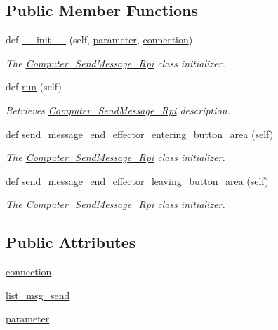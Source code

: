 \subsection*{Public Member Functions}
\begin{DoxyCompactItemize}
\item 
def \hyperlink{classRET__socket_1_1Computer__SendMessage__Rpi_a1370d57533cdac08e579f9012c0bcd7d}{\+\_\+\+\_\+init\+\_\+\+\_\+} (self, \hyperlink{classRET__socket_1_1Computer__SendMessage__Rpi_a0d71b5c1dcca8d3fee88d6a11d3e2071}{parameter}, \hyperlink{classRET__socket_1_1Computer__SendMessage__Rpi_a10275a078bd1abcbebc206cc5d19e18b}{connection})
\begin{DoxyCompactList}\small\item\em The \hyperlink{classRET__socket_1_1Computer__SendMessage__Rpi}{Computer\+\_\+\+Send\+Message\+\_\+\+Rpi} class initializer. \end{DoxyCompactList}\item 
def \hyperlink{classRET__socket_1_1Computer__SendMessage__Rpi_ad22709b2e67308af35f55680d5a026e0}{run} (self)
\begin{DoxyCompactList}\small\item\em Retrieves \hyperlink{classRET__socket_1_1Computer__SendMessage__Rpi}{Computer\+\_\+\+Send\+Message\+\_\+\+Rpi} description. \end{DoxyCompactList}\item 
def \hyperlink{classRET__socket_1_1Computer__SendMessage__Rpi_aac6ae8e343bc98b533b1384540a840e5}{send\+\_\+message\+\_\+end\+\_\+effector\+\_\+entering\+\_\+button\+\_\+area} (self)
\begin{DoxyCompactList}\small\item\em The \hyperlink{classRET__socket_1_1Computer__SendMessage__Rpi}{Computer\+\_\+\+Send\+Message\+\_\+\+Rpi} class initializer. \end{DoxyCompactList}\item 
def \hyperlink{classRET__socket_1_1Computer__SendMessage__Rpi_a8e7a0eb260cc57a97cf2e0293774d253}{send\+\_\+message\+\_\+end\+\_\+effector\+\_\+leaving\+\_\+button\+\_\+area} (self)
\begin{DoxyCompactList}\small\item\em The \hyperlink{classRET__socket_1_1Computer__SendMessage__Rpi}{Computer\+\_\+\+Send\+Message\+\_\+\+Rpi} class initializer. \end{DoxyCompactList}\end{DoxyCompactItemize}
\subsection*{Public Attributes}
\begin{DoxyCompactItemize}
\item 
\hyperlink{classRET__socket_1_1Computer__SendMessage__Rpi_a10275a078bd1abcbebc206cc5d19e18b}{connection}
\item 
\hyperlink{classRET__socket_1_1Computer__SendMessage__Rpi_a5e1510794909be5332fea558ba24eb78}{list\+\_\+msg\+\_\+send}
\item 
\hyperlink{classRET__socket_1_1Computer__SendMessage__Rpi_a0d71b5c1dcca8d3fee88d6a11d3e2071}{parameter}
\end{DoxyCompactItemize}


